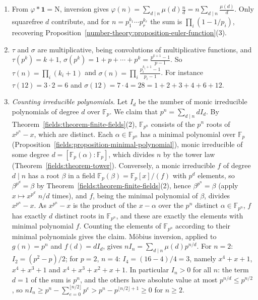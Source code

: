\begin{example}\label{number-theory:example-mobius}
\begin{enumerate}
\item From $\varphi * \mathbf{1} = \mathrm{N}$, inversion gives $\varphi(n) = \sum_{d \mid n}\mu(d)\frac{n}{d} = n\sum_{d \mid n}\frac{\mu(d)}{d}$. Only squarefree $d$ contribute, and for
$n = p_1^{k_1} \cdots p_r^{k_r}$ the sum is $\prod_i(1 - 1/p_i)$, recovering Proposition~\ref{number-theory:proposition-euler-function}(3).
\item $\tau$ and $\sigma$ are multiplicative, being convolutions of multiplicative functions, and $\tau(p^k) = k + 1$, $\sigma(p^k) = 1 + p + \cdots + p^k = \frac{p^{k+1} - 1}{p - 1}$. So
$\tau(n) = \prod_i(k_i + 1)$ and $\sigma(n) = \prod_i\frac{p_i^{k_i+1} - 1}{p_i - 1}$. For instance $\tau(12) = 3 \cdot 2 = 6$ and $\sigma(12) = 7 \cdot 4 = 28 = 1 + 2 + 3 + 4 + 6 + 12$.
\item \emph{Counting irreducible polynomials.} Let $I_d$ be the number of monic irreducible polynomials of degree $d$ over $\mathbb{F}_p$. We claim that $p^n = \sum_{d \mid n}dI_d$. By
Theorem~\ref{fields:theorem-finite-fields}(2), $\mathbb{F}_{p^n}$ consists of the $p^n$ roots of $x^{p^n} - x$, which are distinct. Each $\alpha \in \mathbb{F}_{p^n}$ has a minimal polynomial over $\mathbb{F}_p$
(Proposition~\ref{fields:proposition-minimal-polynomial}), monic irreducible of some degree $d = [\mathbb{F}_p(\alpha) : \mathbb{F}_p]$, which divides $n$ by the tower law
(Theorem~\ref{fields:theorem-tower}). Conversely, a monic irreducible $f$ of degree $d \mid n$ has a root $\beta$ in a field $\mathbb{F}_p(\beta) = \mathbb{F}_p[x]/(f)$ with $p^d$ elements, so
$\beta^{p^d} = \beta$ by Theorem~\ref{fields:theorem-finite-fields}(2), hence $\beta^{p^n} = \beta$ (apply $x \mapsto x^{p^d}$ $n/d$ times), and $f$, being the minimal polynomial of $\beta$, divides
$x^{p^n} - x$. As $x^{p^n} - x$ is the product of the $x - \alpha$ over the $p^n$ distinct $\alpha \in \mathbb{F}_{p^n}$, $f$ has exactly $d$ distinct roots in $\mathbb{F}_{p^n}$, and these are exactly the
elements with minimal polynomial $f$. Counting the elements of $\mathbb{F}_{p^n}$ according to their minimal polynomials gives the claim. M\"obius inversion, applied to $g(n) = p^n$ and $f(d) = dI_d$, gives
$nI_n = \sum_{d \mid n}\mu(d)p^{n/d}$. For $n = 2$: $I_2 = (p^2 - p)/2$; for $p = 2$, $n = 4$: $I_4 = (16 - 4)/4 = 3$, namely $x^4 + x + 1$, $x^4 + x^3 + 1$ and $x^4 + x^3 + x^2 + x + 1$. In particular
$I_n > 0$ for all $n$: the term $d = 1$ of the sum is $p^n$, and the others have absolute value at most $p^{n/d} \leq p^{n/2}$, so
$nI_n \geq p^n - \sum_{e=0}^{\lfloor n/2\rfloor}p^e > p^n - p^{\lfloor n/2\rfloor + 1} \geq 0$ for $n \geq 2$.
\end{enumerate}
\end{example}

